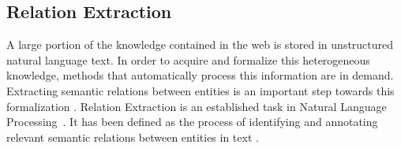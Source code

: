 \subsection{Relation Extraction}
\label{sec:SOA:nlu:relation_extraction}



A large portion of the knowledge contained in the web is stored in unstructured natural language text. In order to acquire and formalize this heterogeneous knowledge, methods that automatically process this information are in demand. Extracting semantic relations between entities is an important step towards this formalization \citep{Wang2008}. Relation Extraction is an established task in Natural Language Processing~\citep{Bach2007}. It has been defined as the process of identifying and annotating relevant semantic relations between entities in text \citep{JiangZhai2007}. 

